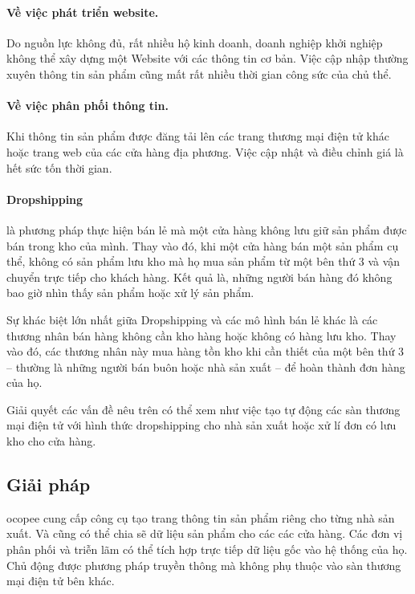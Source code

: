 \documentclass[11pt]{report}
\begin{document}
\paragraph{Về việc phát triển website.}\label{pro:1} Do nguồn lực không đủ, rất nhiều hộ kinh doanh, doanh nghiệp khởi nghiệp không thể xây dựng một Website với các thông tin cơ bản. Việc cập nhập thường xuyên thông tin sản phẩm cũng mất rất nhiều thời gian công sức của chủ thể.

\paragraph{Về việc phân phối thông tin.}\label{pro:2} Khi thông tin sản phẩm được đăng tải  lên các trang thương mại điện tử khác hoặc trang web của các cửa hàng địa phương. Việc cập nhật và điều chỉnh giá là hết sức tốn thời gian.

\paragraph{Dropshipping} là phương pháp thực hiện bán lẻ mà một cửa hàng không lưu giữ sản phẩm được bán trong kho của mình. Thay vào đó, khi một cửa hàng bán một sản phẩm cụ thể, không có sản phẩm lưu kho mà họ mua sản phẩm từ một bên thứ 3 và vận chuyển trực tiếp cho khách hàng. Kết quả là, những người bán hàng đó không bao giờ nhìn thấy sản phẩm hoặc xử lý sản phẩm.

Sự khác biệt lớn nhất giữa Dropshipping và các mô hình bán lẻ khác là các thương nhân bán hàng không cần kho hàng hoặc không có hàng lưu kho. Thay vào đó, các thương nhân này mua hàng tồn kho khi cần thiết của một bên thứ 3 – thường là những người bán buôn hoặc nhà sản xuất – để hoàn thành đơn hàng của họ.

Giải quyết các vấn đề nêu trên có thể xem như việc tạo tự động các sàn thương mại điện tử với hình thức dropshipping cho nhà sản xuất hoặc xử lí đơn có lưu kho cho cửa hàng.

%

\subsection*{Giải pháp}

\gls{ocopee} cung cấp công cụ tạo trang thông tin sản phẩm riêng cho từng nhà sản xuất. Và cũng có thể chia sẽ dữ liệu sản phẩm cho các các cửa hàng. Các đơn vị phân phối và triễn lãm có thể tích hợp trực tiếp dữ liệu gốc vào hệ thống của họ. Chủ động được phương pháp truyền thông mà không phụ thuộc vào sàn thương mại điện tử bên khác.
\end{document}
